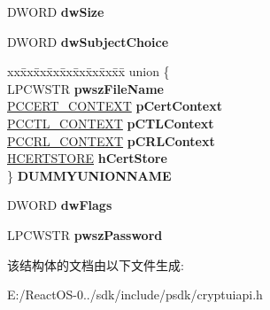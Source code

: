 \begin{DoxyCompactItemize}
\item 
\mbox{\label{struct___c_r_y_p_t_u_i___w_i_z___i_m_p_o_r_t___s_u_b_j_e_c_t___i_n_f_o_aa50f5742cd9f02c938b0f2aeb826917b}} 
D\+W\+O\+RD {\bfseries dw\+Size}
\item 
\mbox{\label{struct___c_r_y_p_t_u_i___w_i_z___i_m_p_o_r_t___s_u_b_j_e_c_t___i_n_f_o_a80f0003765b33b2ab4307380d63d5960}} 
D\+W\+O\+RD {\bfseries dw\+Subject\+Choice}
\item 
\mbox{\label{struct___c_r_y_p_t_u_i___w_i_z___i_m_p_o_r_t___s_u_b_j_e_c_t___i_n_f_o_a67846977882cf18fc3c2a886c379941c}} 
\begin{tabbing}
xx\=xx\=xx\=xx\=xx\=xx\=xx\=xx\=xx\=\kill
union \{\\
\>LPCWSTR {\bfseries pwszFileName}\\
\>\hyperlink{struct___c_e_r_t___c_o_n_t_e_x_t}{PCCERT\_CONTEXT} {\bfseries pCertContext}\\
\>\hyperlink{struct___c_t_l___c_o_n_t_e_x_t}{PCCTL\_CONTEXT} {\bfseries pCTLContext}\\
\>\hyperlink{struct___c_r_l___c_o_n_t_e_x_t}{PCCRL\_CONTEXT} {\bfseries pCRLContext}\\
\>\hyperlink{interfacevoid}{HCERTSTORE} {\bfseries hCertStore}\\
\} {\bfseries DUMMYUNIONNAME}\\

\end{tabbing}\item 
\mbox{\label{struct___c_r_y_p_t_u_i___w_i_z___i_m_p_o_r_t___s_u_b_j_e_c_t___i_n_f_o_afaa31c4f938e4aa4dd4b5f53121c09d7}} 
D\+W\+O\+RD {\bfseries dw\+Flags}
\item 
\mbox{\label{struct___c_r_y_p_t_u_i___w_i_z___i_m_p_o_r_t___s_u_b_j_e_c_t___i_n_f_o_aac585b0078f97216a860b76cae904316}} 
L\+P\+C\+W\+S\+TR {\bfseries pwsz\+Password}
\end{DoxyCompactItemize}


该结构体的文档由以下文件生成\+:\begin{DoxyCompactItemize}
\item 
E\+:/\+React\+O\+S-\/0../sdk/include/psdk/cryptuiapi.\+h\end{DoxyCompactItemize}
